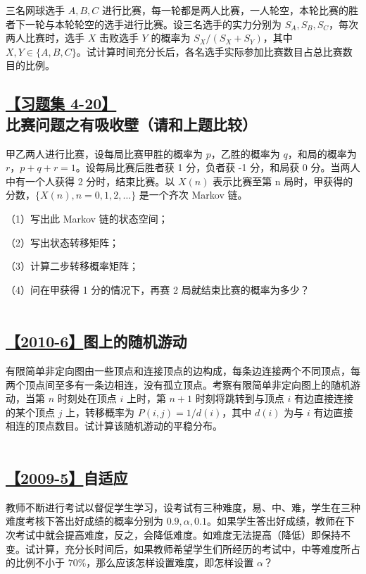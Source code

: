 三名网球选手 $A,B,C$ 进行比赛，每一轮都是两人比赛，一人轮空，本轮比赛的胜者下一轮与本轮轮空的选手进行比赛。设三名选手的实力分别为 $S_A,S_B,S_C$，每次两人比赛时，选手 $X$ 击败选手 $Y$ 的概率为 $S_X/(S_X+S_Y)$，其中 $X,Y \in \{A,B,C\}$。试计算时间充分长后，各名选手实际参加比赛数目占总比赛数目的比例。

\subsection{\hyperref[A4-20]{【习题集 4-20】}比赛问题之有吸收壁（请和上题比较）}\label{Q4-20}

甲乙两人进行比赛，设每局比赛甲胜的概率为 $p$，乙胜的概率为 $q$，和局的概率为 $r$，$p+q+r=1$。设每局比赛后胜者获 1 分，负者获 -1 分，和局获 0 分。当两人中有一个人获得 2 分时，结束比赛。以 $X(n)$ 表示比赛至第 n 局时，甲获得的分数，$\{X(n), n=0,1,2,\dots\}$ 是一个齐次 Markov 链。


（1）写出此 Markov 链的状态空间；

（2）写出状态转移矩阵；

（3）计算二步转移概率矩阵；

（4）问在甲获得 1 分的情况下，再赛 2 局就结束比赛的概率为多少？
\\\\
\subsection{\hyperref[A2010-6]{【2010-6】}图上的随机游动}\label{Q2010-6}

有限简单非定向图由一些顶点和连接顶点的边构成，每条边连接两个不同顶点，每两个顶点间至多有一条边相连，没有孤立顶点。考察有限简单非定向图上的随机游动，当第 $n$ 时刻处在顶点 $i$ 上时，第 $n+1$ 时刻将跳转到与顶点 $i$ 有边直接连接的某个顶点 $j$ 上，转移概率为 $P(i, j)=1/d(i)$，其中 $d(i)$ 为与 $i$ 有边直接相连的顶点数目。试计算该随机游动的平稳分布。
\\\\
\subsection{\hyperref[A2009-5]{【2009-5】}自适应}\label{Q2009-5}

教师不断进行考试以督促学生学习，设考试有三种难度，易、中、难，学生在三种难度考核下答出好成绩的概率分别为 $0.9, \alpha, 0.1$。如果学生答出好成绩，教师在下次考试中就会提高难度，反之，会降低难度。如难度无法提高（降低）即保持不变。试计算，充分长时间后，如果教师希望学生们所经历的考试中，中等难度所占的比例不小于 $70\%$，那么应该怎样设置难度，即怎样设置 $\alpha$？

